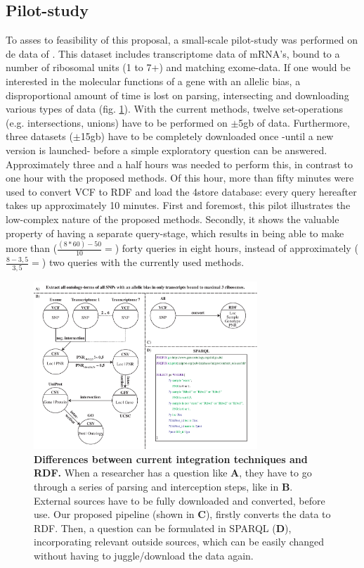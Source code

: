 \documentclass[twoside,fontsize=12pt]{article}
\begin{document}
\subsection*{Pilot-study}
To asses to feasibility of this proposal, a small-scale pilot-study was performed on de data of \citet{VanHeesch2014}. This dataset includes transcriptome data of mRNA's, bound to a number of ribosomal units (1 to 7+) and matching exome-data. If one would be interested in the molecular functions of a gene with an allelic bias, a disproportional amount of time is lost on parsing, intersecting and downloading various types of data (fig. \ref{fig:awesome_image}). With the current methods, twelve set-operations (e.g. intersections, unions) have to be performed on $\pm$5gb of data. Furthermore, three datasets ($\pm$15gb) have to be completely downloaded once -until a new version is launched- before a simple exploratory question can be answered. Approximately three and a half hours was needed to perform this, in contrast to one hour with the proposed methods. Of this hour, more than fifty minutes were used to convert VCF to RDF and load the 4store database: every query hereafter takes up approximately 10 minutes. First and foremost, this pilot illustrates the low-complex nature of the proposed methods. Secondly, it shows the valuable property of having a separate query-stage, which results in being able to make more than ($\frac{(8*60)-50}{10}= $) forty queries in eight hours, instead of approximately ($\frac{8-3,5}{3,5}= $) two queries with the currently used methods.
\begin{figure}[h!]
    \centering
    \includegraphics[width=0.75\textwidth]{DifferencesInDoingThings}
    \caption{\textbf{Differences between current integration techniques and RDF.} When a researcher has a question like \textbf{A}, they have to go through a series of parsing and interception steps, like in \textbf{B}. External sources have to be fully downloaded and converted, before use. Our proposed pipeline (shown in \textbf{C}), firstly converts the data to RDF. Then, a question can be formulated in SPARQL (\textbf{D}), incorporating relevant outside sources, which can be easily changed without having to juggle/download the data again.}
    \label{fig:awesome_image}
\end{figure}
\newpage
\end{document}
